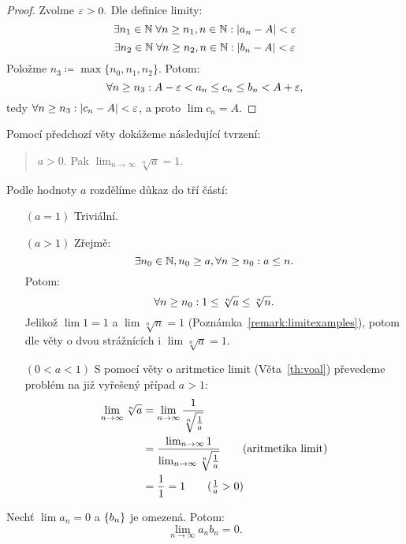\begin{proof} 
    Zvolme $\varepsilon > 0.$ Dle definice limity:
    $$\exists n_1 \in \mathbb{N} \; \forall n \geq n_1, n \in \mathbb{N}: |a_n - A| < \varepsilon$$
    $$\exists n_2 \in \mathbb{N} \; \forall n \geq n_2, n \in \mathbb{N}: |b_n - A| < \varepsilon$$
    Položme $n_3 \coloneqq \max\{n_0,n_1,n_2\}$. Potom:
    $$\forall n \geq n_3: A - \varepsilon < a_n \leq c_n \leq b_n < A + \varepsilon,$$
    tedy $\forall n \geq n_3: |c_n - A| < \varepsilon$, a proto $\lim c_n = A$.
\end{proof}

\begin{remark}
    Pomocí předchozí věty dokážeme následující tvrzení:
    \begin{quote}  
        \Necht $a>0.$ Pak $\lim_{n\to\infty} \sqrt[n]{a} = 1.$
    \end{quote}
    Podle hodnoty $a$ rozdělíme důkaz do tří částí:
    \begin{itemize}
        \item[$(a = 1)$] Triviální.
        \item[$(a > 1)$] Zřejmě: $$\exists n_0 \in \mathbb{N}, n_0 \geq a, \forall n \geq n_0: 
            a \leq n.$$ Potom:
            $$\forall n \geq n_0: 1 \leq \sqrt[n]{a} \leq \sqrt[n]{n}.$$
            Jelikož $\lim 1 = 1$ a $\lim \sqrt[n]{n} = 1$ 
            (Poznámka~\ref{remark:limitexamples}), potom dle věty o dvou 
            strážnících i $\lim \sqrt[n]{a} = 1$.
        \item[$(0 < a < 1)$] 
            S pomocí věty o aritmetice limit (Věta~\ref{th:voal}) převedeme 
            problém na již vyřešený případ $a > 1:$
            \begin{align*}
                \lim_{n \to \infty} \sqrt[n]{a} &= \lim_{n \to \infty} 
                \frac{1}{\sqrt[n]{\frac{1}{a}}} \\
                &= \frac{\lim_{n\to\infty} 1}{\lim_{n\to\infty} 
            \sqrt[n]{\frac{1}{a}}} \tag{aritmetika limit} \\
                &= \frac{1}{1} = 1 \tag{$\frac{1}{a} > 0$}
            \end{align*}
    \end{itemize}
    
\end{remark}

\begin{theorem}
    \label{th:mizejici}
    Nechť $\lim a_n = 0$ a $\left\{b_n\right\}$ je omezená. Potom:
    $$\lim_{n\to\infty}a_nb_n = 0.$$
\end{theorem}

